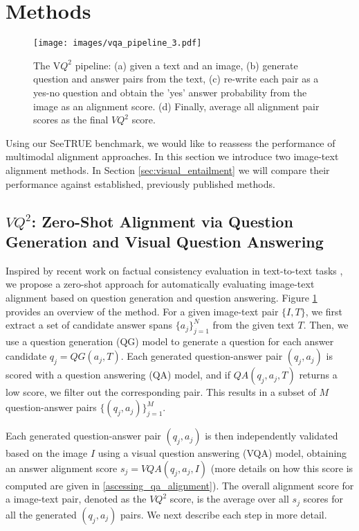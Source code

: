 \documentclass{article}
\newcommand{\datasetname}[0]{SeeTRUE\xspace}
\begin{document}
\section{Methods}
\label{sec:method}
\begin{figure}[!t]
    \centering
    \texttt{[image: images/vqa\_pipeline\_3.pdf]}\\
    \vspace{-10px}
    \caption{The V$Q^2$ pipeline: (a) given a text and an image, (b) generate question and answer pairs from the text, (c)  re-write each pair as a yes-no question and obtain the 'yes' answer probability from the image as an alignment score. (d) Finally, average all alignment pair scores as the final $VQ^2$ score.
    }
    \vspace{-10px}
    \label{fig:fig_zeroshot_method}
\end{figure}
 Using our \datasetname benchmark, we would like to reassess the performance of multimodal alignment approaches. In this section we introduce two image-text alignment methods. In Section \ref{sec:visual_entailment} we will compare their performance against established, previously published methods.

\subsection{\texorpdfstring{$VQ^2$: Zero-Shot Alignment via Question Generation and Visual Question Answering}{VQ2: Zero-Shot Alignment via Question Generation and Visual Question Answering}}


Inspired by recent work on factual consistency evaluation in text-to-text tasks \citep{wang-etal-2020-asking, honovich2021q, scialom-etal-2021-questeval}, we propose a zero-shot approach for automatically evaluating image-text alignment based on question generation and question answering. Figure \ref{fig:fig_zeroshot_method} provides an overview of the method.
For a given image-text pair $\{I, T\}$, we first extract a set of candidate answer spans $\{a_j\}_{j=1}^{N}$ from the given text $T$. 
Then, we use a question generation (QG) model to generate a question for each answer candidate $q_j = QG(a_j, T)$. 
Each generated question-answer pair $(q_j, a_j)$ is scored with a question answering (QA) model, and if $QA(q_j, a_j, T)$ returns a low score, we filter out the corresponding pair.
This results in a subset of $M$ question-answer pairs $\{(q_j, a_j)\}_{j=1}^M$. 

Each generated question-answer pair $(q_j, a_j)$ is then independently validated based on the image $I$ using a visual question answering (VQA) model, obtaining an answer alignment score $s_j = VQA(q_j, a_j, I)$ (more details on how this score is computed are given in \ref{ascessing_qa_alignment}).
The overall alignment score for a image-text pair, denoted as the $VQ^2$ score, is the average over all $s_j$ scores for all the generated $(q_j, a_j)$ pairs.
 We next describe each step in more detail.
\end{document}
